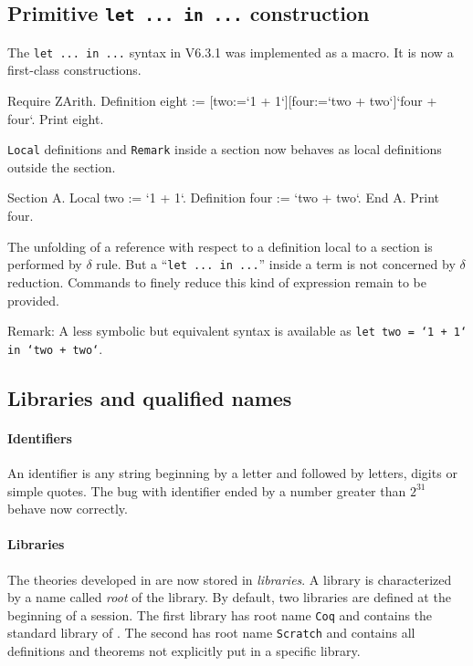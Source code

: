 \documentclass[11pt]{article}
\begin{document}
\label{Language}
\subsection{Primitive {\tt let ... in ...} construction}
\label{Letin}
The {\tt let ... in ...} syntax in V6.3.1 was implemented as a
macro. It is now a first-class constructions.

\begin{coq_example}
Require ZArith.
Definition eight := [two:=`1 + 1`][four:=`two + two`]`four + four`. 
Print eight.
\end{coq_example}

{\tt Local} definitions and {\tt Remark} inside a section now behaves
as local definitions outside the section.

\begin{coq_example}
Section A.
Local two := `1 + 1`.
Definition four := `two + two`.
End A.
Print four.
\end{coq_example}

The unfolding of a reference with respect to a definition local to a section
is performed by $\delta$ rule. But a ``{\tt let ... in ...}'' inside a term
is not concerned by $\delta$ reduction. Commands to finely reduce this
kind of expression remain to be provided.
\medskip

Remark: A less symbolic but equivalent syntax is available as {\tt let
two = `1 + 1` in `two + two`}.

\subsection{Libraries and qualified names}
\label{Names}

\paragraph{Identifiers} An identifier is any string beginning by a
letter and followed by letters, digits or simple quotes. The bug with
identifier ended by a number greater than $2^{31}$ behave now correctly.

\paragraph{Libraries}

The theories developed in {\Coq} are now stored in {\it libraries}.  A
library is characterized by a name called {\it root} of the
library. By default, two libraries are defined at the beginning of a
{\Coq} session. The first library has root name {\tt Coq} and contains the
standard library of \Coq. The second has root name {\tt Scratch} and
contains all definitions and theorems not explicitly put in a specific
library. 
\end{document}
